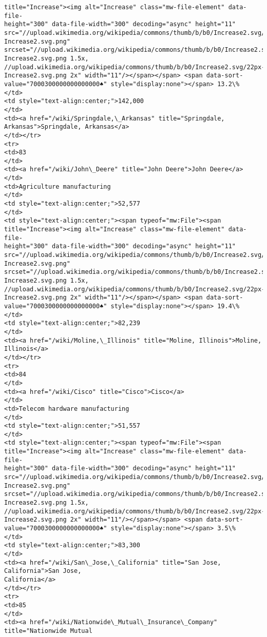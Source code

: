 \documentclass[11pt]{article}
\begin{document}
\begin{Verbatim}[commandchars=\\\{\}]
title="Increase"><img alt="Increase" class="mw-file-element" data-file-
height="300" data-file-width="300" decoding="async" height="11"
src="//upload.wikimedia.org/wikipedia/commons/thumb/b/b0/Increase2.svg/11px-
Increase2.svg.png"
srcset="//upload.wikimedia.org/wikipedia/commons/thumb/b/b0/Increase2.svg/17px-
Increase2.svg.png 1.5x,
//upload.wikimedia.org/wikipedia/commons/thumb/b/b0/Increase2.svg/22px-
Increase2.svg.png 2x" width="11"/></span></span> <span data-sort-
value="7000300000000000000♠" style="display:none"></span> 13.2\%
</td>
<td style="text-align:center;">142,000
</td>
<td><a href="/wiki/Springdale,\_Arkansas" title="Springdale,
Arkansas">Springdale, Arkansas</a>
</td></tr>
<tr>
<td>83
</td>
<td><a href="/wiki/John\_Deere" title="John Deere">John Deere</a>
</td>
<td>Agriculture manufacturing
</td>
<td style="text-align:center;">52,577
</td>
<td style="text-align:center;"><span typeof="mw:File"><span
title="Increase"><img alt="Increase" class="mw-file-element" data-file-
height="300" data-file-width="300" decoding="async" height="11"
src="//upload.wikimedia.org/wikipedia/commons/thumb/b/b0/Increase2.svg/11px-
Increase2.svg.png"
srcset="//upload.wikimedia.org/wikipedia/commons/thumb/b/b0/Increase2.svg/17px-
Increase2.svg.png 1.5x,
//upload.wikimedia.org/wikipedia/commons/thumb/b/b0/Increase2.svg/22px-
Increase2.svg.png 2x" width="11"/></span></span> <span data-sort-
value="7000300000000000000♠" style="display:none"></span> 19.4\%
</td>
<td style="text-align:center;">82,239
</td>
<td><a href="/wiki/Moline,\_Illinois" title="Moline, Illinois">Moline,
Illinois</a>
</td></tr>
<tr>
<td>84
</td>
<td><a href="/wiki/Cisco" title="Cisco">Cisco</a>
</td>
<td>Telecom hardware manufacturing
</td>
<td style="text-align:center;">51,557
</td>
<td style="text-align:center;"><span typeof="mw:File"><span
title="Increase"><img alt="Increase" class="mw-file-element" data-file-
height="300" data-file-width="300" decoding="async" height="11"
src="//upload.wikimedia.org/wikipedia/commons/thumb/b/b0/Increase2.svg/11px-
Increase2.svg.png"
srcset="//upload.wikimedia.org/wikipedia/commons/thumb/b/b0/Increase2.svg/17px-
Increase2.svg.png 1.5x,
//upload.wikimedia.org/wikipedia/commons/thumb/b/b0/Increase2.svg/22px-
Increase2.svg.png 2x" width="11"/></span></span> <span data-sort-
value="7000300000000000000♠" style="display:none"></span> 3.5\%
</td>
<td style="text-align:center;">83,300
</td>
<td><a href="/wiki/San\_Jose,\_California" title="San Jose, California">San Jose,
California</a>
</td></tr>
<tr>
<td>85
</td>
<td><a href="/wiki/Nationwide\_Mutual\_Insurance\_Company" title="Nationwide Mutual

\end{Verbatim}
\end{document}
